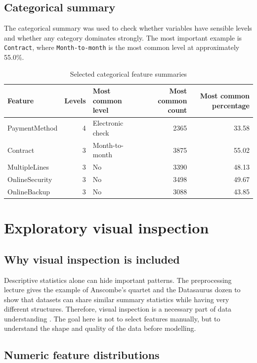 \subsection{Categorical summary}

The categorical summary was used to check whether variables have sensible levels and whether any category dominates strongly. The most important example is \texttt{Contract}, where \texttt{Month-to-month} is the most common level at approximately 55.0\%.

\begin{table}[H]
\centering
\caption{Selected categorical feature summaries}
\begin{tabular}{lrlrr}
\toprule
Feature & Levels & Most common level & Most common count & Most common percentage \\
\midrule
PaymentMethod & 4 & Electronic check & 2365 & 33.58 \\
Contract & 3 & Month-to-month & 3875 & 55.02 \\
MultipleLines & 3 & No & 3390 & 48.13 \\
OnlineSecurity & 3 & No & 3498 & 49.67 \\
OnlineBackup & 3 & No & 3088 & 43.85 \\
\bottomrule
\end{tabular}
\end{table}

\section{Exploratory visual inspection}

\subsection{Why visual inspection is included}

Descriptive statistics alone can hide important patterns. The preprocessing lecture gives the example of Anscombe's quartet and the Datasaurus dozen to show that datasets can share similar summary statistics while having very different structures. Therefore, visual inspection is a necessary part of data understanding \cite{ml-preprocessing}. The goal here is not to select features manually, but to understand the shape and quality of the data before modelling.

\subsection{Numeric feature distributions}

